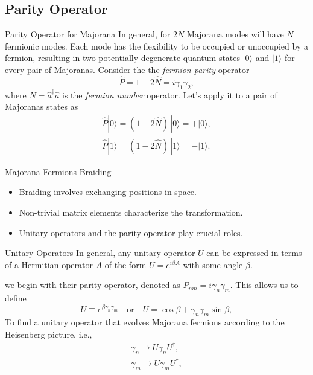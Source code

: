 \documentclass{loyola-beamer}
\begin{document}
\subsection{Parity Operator}

\begin{frame}{Parity Operator for Majorana}
	In general, for $ 2N $ Majorana modes will have $ N $ fermionic modes. Each mode has the flexibility to be occupied or unoccupied by a fermion, resulting in two potentially degenerate quantum states $ | 0 \rangle $ and $ | 1 \rangle $ for every pair of Majoranas. Consider the the \textit{fermion parity} operator
	\begin{equation}
		\hat{P} = 1- 2 \hat{N} = i \gamma_1 \gamma_2,
		\label{eq:ferm parity}
	\end{equation}
	where $ N = \hat{a}^\dagger \hat{a} $ is the \textit{fermion number} operator. Let's apply it to a pair of Majoranas states as
	$$
		\begin{aligned}
			\hat{P} |0\rangle = (1-2\hat{N})\, |0\rangle = + |0\rangle, \\
			\hat{P} |1\rangle = (1-2\hat{N})\, |1\rangle = - |1\rangle.
		\end{aligned}
	$$

\end{frame}

\begin{frame}{Majorana Fermions Braiding}
	\begin{itemize}
		\item Braiding involves exchanging positions in space.
		\item Non-trivial matrix elements characterize the transformation.
		\item Unitary operators and the parity operator play crucial roles.
	\end{itemize}
\end{frame}

\begin{frame}
	\begin{block}{Unitary Operators}
		In general, any unitary operator $ U $ can be expressed in terms of a Hermitian operator $ A $ of the form $ U = e^{i\beta A} $ with some angle $ \beta $.
	\end{block}
	we begin with their parity operator, denoted as $ P_{nm} = i \gamma_n \gamma_m $. This allows us to define
	\begin{equation}
		U \equiv e^{\beta \gamma_n \gamma_m} \quad \text{or} \quad U = \cos{\beta} + \gamma_n \gamma_m \sin{\beta},
		\label{eq:U in beta}
	\end{equation}
	To find a unitary operator that evolves Majorana fermions according to the Heisenberg picture, i.e.,
	$$
		\begin{aligned}
			\gamma_n \rightarrow U \gamma_n U ^\dagger, \\
			\gamma_m \rightarrow U \gamma_m U ^\dagger,
		\end{aligned}
	$$
\end{frame}
\end{document}
